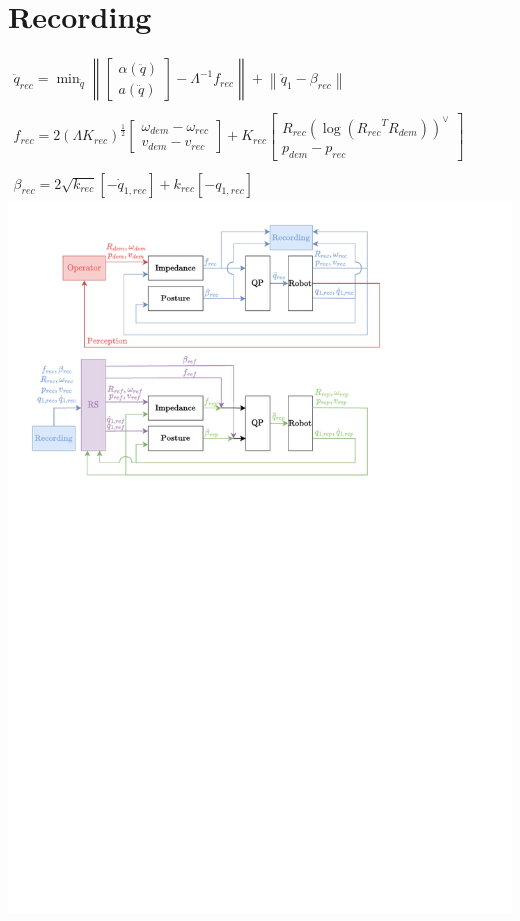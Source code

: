 \documentclass[11pt]{report}
\numberwithin{equation}{section}        %
\numberwithin{figure}{section}          %
\numberwithin{table}{section}           %
\begin{document}
\section*{Recording}

$\begin{array}{l}
\ddot{q}_{rec} = \min_{\ddot{q}}\left \|  \begin{bmatrix}
\alpha(\ddot{q})\\ 
a(\ddot{q})
\end{bmatrix} - \Lambda^{-1}f_{rec} \right \| + \left \| \ddot{q}_1-\beta_{rec} \right \|\\\\
f_{rec} =2(\Lambda K_{rec})^{\frac{1}{2}} \begin{bmatrix}
\omega_{dem} - \omega_{rec}
\\ 
v_{dem}-v_{rec}
\end{bmatrix} + K_{rec} \begin{bmatrix}
R_{rec}(\log({R_{rec}}^TR_{dem}))^{\vee }\\ 
p_{dem}-p_{rec}
\end{bmatrix}\\\\
\beta_{rec} = 2\sqrt{k_{rec}}\left [ -\dot{q}_{1,rec}  \right ] + k_{rec}\left [ -q_{1,rec}  \right ]

\end{array}$\\
\includegraphics[trim={1cm 23.3cm 5cm 1cm}, clip]{Graphics/qp.pdf}\\
\end{document}
